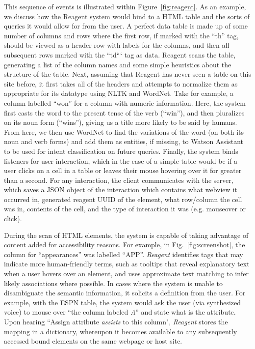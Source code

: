 This sequence of events is illustrated within Figure~\ref{fig:reagent}. As an example, we discuss how the
Reagent system would bind to a HTML table and the sorts of queries it would allow for from the user. A perfect data table
is made up of some number of columns and rows where the first row, if marked with the ``th'' tag, should be viewed
as a header row with labels for the columns, and then all subsequent rows marked with the ``td``` tag as data. Reagent
scans the table, generating a list of the column names and some simple heuristics about the structure of the table. Next,
assuming that Reagent has never seen a table on this site before, it first takes all of the headers and attempts to
normalize them as appropriate for its datatype using NLTK and WordNet. Take for example, a column labelled ``won''
for a column with numeric information. Here, the system first casts the word to the present tense of the verb (``win''),
and then pluralizes on its noun form (``wins''), giving us a title more likely to be said by humans. From here, we then
use WordNet to find the variations of the word (on both its noun and verb forms) and add them as entities, if missing,
to Watson Assistant to be used for intent classification on future queries.
Finally, the system binds listeners for user interaction, which in the case of a simple table would be if a user clicks on
a cell in a table or leaves their mouse hovering over it for greater than a second. For any interaction, the client
communicates with the server, which saves a JSON object of the interaction which contains what webview it occurred in,
generated reagent UUID of the element, what row/column the cell was in, contents of the cell, and the type of interaction
it was (e.g. mouseover or click).

During the scan of HTML elements, the system is capable of taking advantage of
content added for accessibility reasons. For example, in
Fig.~\ref{fig:screenshot}, the column for ``appearances'' was labelled ``APP''.
\textit{Reagent} identifies tags that may indicate more human-friendly terms,
such as tooltips that reveal explanatory text when a user hovers over an
element, and uses approximate text matching to infer likely associations where
possible.
In cases where the system is unable to disambiguate the semantic information, it
solicits a definition from the user. For example, with the ESPN table, the
system would ask the user (via synthesized voice) to mouse over ``the column
labeled  \textit{A}'' and state what is the attribute. Upon hearing ``Assign
attribute \textit{assists} to this column", \textit{Reagent} stores the
mapping in a dictionary, whereupon it becomes available to any subsequently
accessed bound elements on the same webpage or host site.

